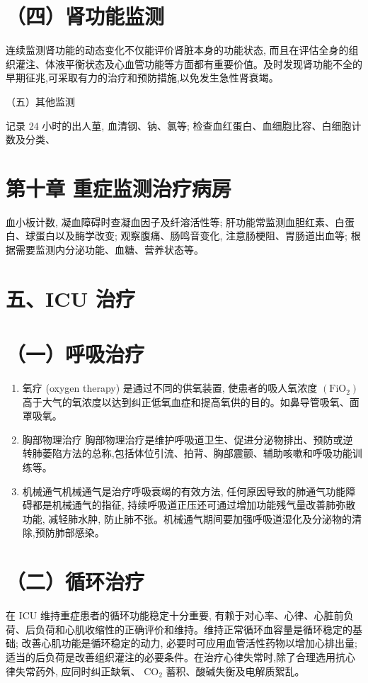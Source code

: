 \documentclass[10pt]{article}
\begin{document}
\section*{（四）肾功能监测}
连续监测肾功能的动态变化不仅能评价肾脏本身的功能状态, 而且在评估全身的组织灌注、体液平衡状态及心血管功能等方面都有重要价值。及时发现肾功能不全的早期征兆,可采取有力的治疗和预防措施,以免发生急性肾衰竭。

（五）其他监测

记录 24 小时的出人荲, 血清钢、钠、氯等; 检查血红蛋白、血细胞比容、白细胞计数及分类、

\section*{第十章 重症监测治疗病房}
血小板计数, 凝血障碍时查凝血因子及纤溶活性等; 肝功能常监测血胆红素、白蛋白、球蛋白以及酶学改变; 观察腹痛、肠鸣音变化, 注意肠梗阻、胃肠道出血等; 根据需要监测内分泌功能、血糖、营养状态等。

\section*{五、ICU 治疗}
\section*{（一）呼吸治疗}
\begin{enumerate}
  \item 氧疗 (oxygen therapy) 是通过不同的供氧装置, 使患者的吸人氧浓度 $\left(\mathrm{FiO}_{2}\right)$ 高于大气的氧浓度以达到纠正低氧血症和提高氧供的目的。如鼻导管吸氧、面罩吸氧。

  \item 胸部物理治疗 胸部物理治疗是维护呼吸道卫生、促进分泌物排出、预防或逆转肺萎陷方法的总称,包括体位引流、拍背、胸部震颤、辅助咳嗽和呼吸功能训练等。

  \item 机械通气机械通气是治疗呼吸衰竭的有效方法, 任何原因导致的肺通气功能障碍都是机械通气的指征, 持续呼吸道正压还可通过增加功能残气量改善肺弥散功能, 减轻肺水肿, 防止肺不张。机械通气期间要加强呼吸道湿化及分泌物的清除,预防肺部感染。

\end{enumerate}

\section*{（二）循环治疗}
在 ICU 维持重症患者的循环功能稳定十分重要, 有赖于对心率、心律、心脏前负荷、后负荷和心肌收缩性的正确评价和维持。维持正常循环血容量是循环稳定的基础; 改善心肌功能是循环稳定的动力, 必要时可应用血管活性药物以增加心排出量; 适当的后负荷是改善组织灌注的必要条件。在治疗心律失常时,除了合理选用抗心律失常药外, 应同时纠正缺氧、 $\mathrm{CO}_{2}$ 蓄积、酸碱失衡及电解质絮乱。
\end{document}
